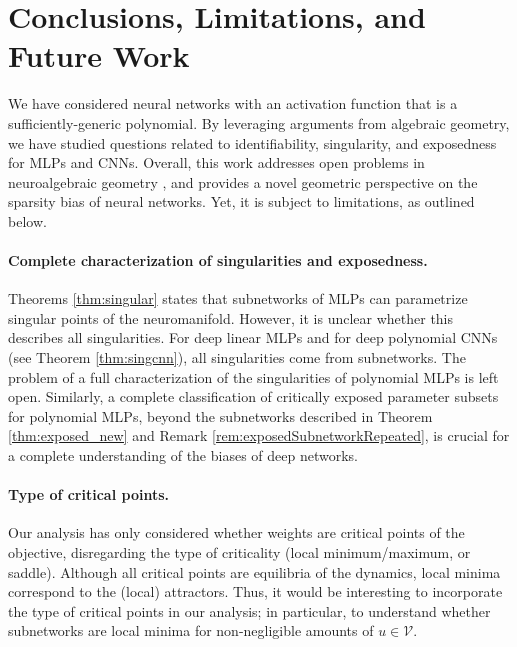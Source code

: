 \documentclass{article} %
\theoremstyle{plain}%
\theoremstyle{definition}
\theoremstyle{remark}
\begin{document}
\section{Conclusions, Limitations, and Future Work}\label{sec:conclim}
We have considered neural networks with an activation function that is a sufficiently-generic polynomial. By leveraging  arguments from algebraic geometry, we have studied questions related to identifiability, singularity, and exposedness for MLPs and CNNs. Overall, this work addresses open problems in neuroalgebraic geometry \citep{marchetti2024harmonics}, and provides a novel geometric perspective on the sparsity bias of neural networks. Yet, it is subject to limitations, as outlined below. 
    
\paragraph{Complete characterization of singularities and exposedness.} Theorems \ref{thm:singular}  states that subnetworks of MLPs can parametrize singular points of the neuromanifold. However, it is unclear whether this describes all singularities. For deep linear MLPs \citep{trager2019pure} and for deep polynomial CNNs (see Theorem \ref{thm:singcnn}), all singularities come from subnetworks. The problem of a full characterization of the singularities of polynomial MLPs is left open.
Similarly, a complete classification of critically exposed parameter subsets for polynomial MLPs, beyond the subnetworks described in Theorem \ref{thm:exposed_new} and Remark \ref{rem:exposedSubnetworkRepeated},  is crucial for a complete understanding of the biases of deep networks. 

\paragraph{Type of critical points.} Our analysis has only considered whether weights are critical points of the objective, disregarding the type of criticality (local minimum/maximum, or saddle). Although all critical points are equilibria of the dynamics, local minima correspond to the (local) attractors. Thus, it would be interesting to incorporate the type of critical points in our analysis; in particular, to understand whether subnetworks are local minima for non-negligible amounts of $u \in \mathcal{V}$. 
\end{document}
